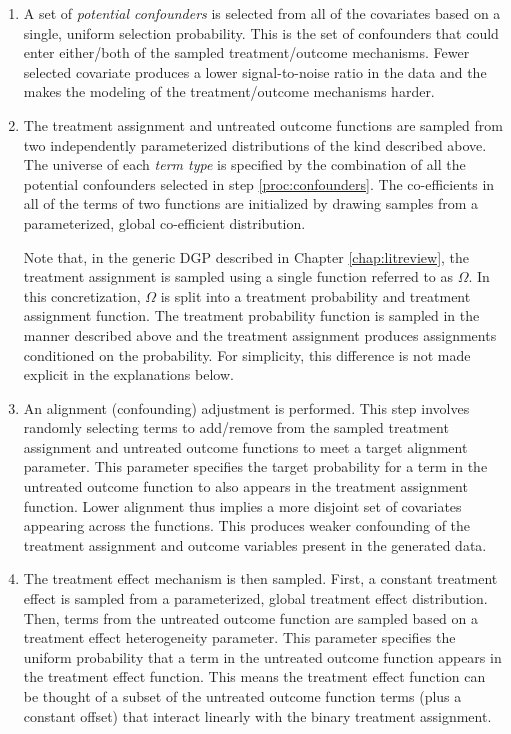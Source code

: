 \documentclass[../main.tex]{subfiles}
\begin{document}
\begin{enumerate}
    \item A set of \textit{potential confounders} is selected from all of the covariates based on a single, uniform selection probability. This is the set of confounders that could enter either/both of the sampled treatment/outcome mechanisms. Fewer selected covariate produces a lower signal-to-noise ratio in the data and the makes the modeling of the treatment/outcome mechanisms harder. \label{proc:confounders}
    
    \item The treatment assignment and untreated outcome functions are sampled from two independently parameterized distributions of the kind described above. The universe of each \textit{term type} is specified by the combination of all the potential confounders selected in step \ref{proc:confounders}. The co-efficients in all of the terms of two functions are initialized by drawing samples from a parameterized, global co-efficient distribution.
    
    \vspace{\baselineskip}
    
    Note that, in the generic DGP described in Chapter \ref{chap:litreview}, the treatment assignment is sampled using a single function referred to as $\Omega$. In this concretization, $\Omega$ is split into a treatment probability and treatment assignment function. The treatment probability function is sampled in the manner described above and the treatment assignment produces assignments conditioned on the probability. For simplicity, this difference is not made explicit in the explanations below.
    
    \item An alignment (confounding) adjustment is performed. This step involves randomly selecting terms to add/remove from the sampled treatment assignment and untreated outcome functions to meet a target alignment parameter. This parameter specifies the target probability for a term in the untreated outcome function to also appears in the treatment assignment function. Lower alignment thus implies a more disjoint set of covariates appearing across the functions. This produces weaker confounding of the treatment assignment and outcome variables present in the generated data.
    
    \item The treatment effect mechanism is then sampled. First, a constant treatment effect is sampled from a parameterized, global treatment effect distribution. Then, terms from the untreated outcome function are sampled based on a treatment effect heterogeneity parameter. This parameter specifies the uniform probability that a term in the untreated outcome function appears in the treatment effect function. This means the treatment effect function can be thought of a subset of the untreated outcome function terms (plus a constant offset) that interact linearly with the binary treatment assignment.
    

\end{enumerate}
\end{document}
